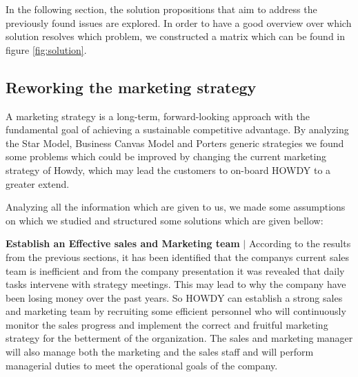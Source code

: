 In the following section, the solution propositions that aim to address the previously found issues are explored. In order to have a good overview over which solution resolves which problem, we constructed a matrix which can be found in figure \ref{fig:solution}.

\subsection{Reworking the marketing strategy}

A marketing strategy is a long-term, forward-looking approach with the fundamental goal of achieving a sustainable competitive advantage. By analyzing the Star Model, Business Canvas Model and Porters generic strategies we found some problems which could be improved by changing the current marketing strategy of Howdy, which may lead the customers to on-board HOWDY to a greater extend.

\noindent Analyzing all the information which are given to us, we made some assumptions on which we studied and structured some solutions which are given bellow:

\noindent \textbf{Establish an Effective sales and Marketing team}  $|$ According to the results from the previous sections, it has been identified that the companys current sales team is inefficient and from the company presentation it was revealed that daily tasks intervene with strategy meetings. This may lead to why the company have been losing money over the past years. So HOWDY can establish a strong sales and marketing team by recruiting some efficient personnel who will continuously monitor the sales progress and implement the correct and fruitful marketing strategy for the betterment of the organization. The sales and marketing manager will also manage both the marketing and the sales staff and will perform managerial duties to meet the operational goals of the company.


